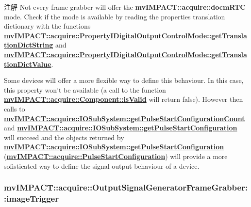 \begin{DoxyNote}{注解}
Not every frame grabber will offer the {\bfseries mv\+I\+M\+P\+A\+C\+T\+::acquire\+::docm\+R\+T\+C} mode. Check if the mode is available by reading the properties translation dictionary with the functions {\bfseries \hyperlink{classmv_i_m_p_a_c_t_1_1acquire_1_1_enum_property_i_af5ec5a9c3657af2917f4ead78ef067db}{mv\+I\+M\+P\+A\+C\+T\+::acquire\+::\+Property\+I\+Digital\+Output\+Control\+Mode\+::get\+Translation\+Dict\+String}} and {\bfseries \hyperlink{classmv_i_m_p_a_c_t_1_1acquire_1_1_enum_property_i_a0c50700ebff2806621c63d03b624f200}{mv\+I\+M\+P\+A\+C\+T\+::acquire\+::\+Property\+I\+Digital\+Output\+Control\+Mode\+::get\+Translation\+Dict\+Value}}.
\end{DoxyNote}
Some devices will offer a more flexible way to define this behaviour. In this case, this property won't be available (a call to the function {\bfseries \hyperlink{classmv_i_m_p_a_c_t_1_1acquire_1_1_component_ac51e55e7e046101f3c6119d84123abd5}{mv\+I\+M\+P\+A\+C\+T\+::acquire\+::\+Component\+::is\+Valid}} will return false). However then calls to {\bfseries \hyperlink{classmv_i_m_p_a_c_t_1_1acquire_1_1_i_o_sub_system_a6f33bc4f6613b7c8b268beba61a09661}{mv\+I\+M\+P\+A\+C\+T\+::acquire\+::\+I\+O\+Sub\+System\+::get\+Pulse\+Start\+Configuration\+Count}} and {\bfseries \hyperlink{classmv_i_m_p_a_c_t_1_1acquire_1_1_i_o_sub_system_af699c6e691ece416ec2242d08e35cb58}{mv\+I\+M\+P\+A\+C\+T\+::acquire\+::\+I\+O\+Sub\+System\+::get\+Pulse\+Start\+Configuration}} will succeed and the objects returned by {\bfseries \hyperlink{classmv_i_m_p_a_c_t_1_1acquire_1_1_i_o_sub_system_af699c6e691ece416ec2242d08e35cb58}{mv\+I\+M\+P\+A\+C\+T\+::acquire\+::\+I\+O\+Sub\+System\+::get\+Pulse\+Start\+Configuration}} ({\bfseries \hyperlink{classmv_i_m_p_a_c_t_1_1acquire_1_1_pulse_start_configuration}{mv\+I\+M\+P\+A\+C\+T\+::acquire\+::\+Pulse\+Start\+Configuration}}) will provide a more sofisticated way to define the signal output behaviour of a device. \hypertarget{classmv_i_m_p_a_c_t_1_1acquire_1_1_output_signal_generator_frame_grabber_a7b84a665907ea8d08f8dbf0be76f8388}{
\subsubsection[{image\+Trigger}]{ mv\+I\+M\+P\+A\+C\+T\+::acquire\+::\+Output\+Signal\+Generator\+Frame\+Grabber\+::image\+Trigger}}\label{classmv_i_m_p_a_c_t_1_1acquire_1_1_output_signal_generator_frame_grabber_a7b84a665907ea8d08f8dbf0be76f8388}


